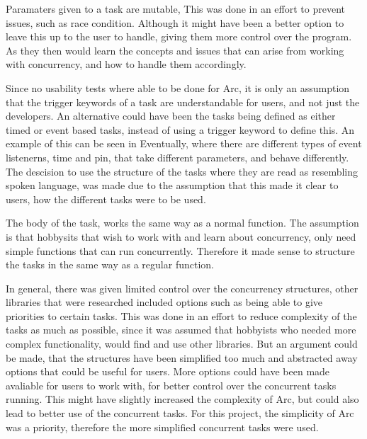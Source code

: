 Paramaters given to a task are mutable, This was done in an effort to prevent issues, such as race condition. Although it might have been a better option to leave this up to the user to handle, giving them more control over the program. As they then would learn the concepts and issues that can arise from working with concurrency, and how to handle them accordingly.

Since no usability tests where able to be done for Arc, it is only an assumption that the trigger keywords of a task are understandable for users, and not just the developers. An alternative could have been the tasks being defined as either timed or event based tasks, instead of using a trigger keyword to define this. An example of this can be seen in Eventually, where there are different types of event listenerns, time and pin, that take different parameters, and behave differently. The descision to use the structure of the tasks where they are read as resembling spoken language, was made due to the assumption that this made it clear to users, how the different tasks were to be used.





The body of the task, works the same way as a normal function. The assumption is that hobbysits that wish to work with and learn about concurrency, only need simple functions that can run concurrently. Therefore it made sense to structure the tasks in the same way as a regular function.

In general, there was given limited control over the concurrency structures, other libraries that were researched included options such as being able to give priorities to certain tasks. This was done in an effort to reduce complexity of the tasks as much as possible, since it was assumed that hobbyists who needed more complex functionality, would find and use other libraries. But an argument could be made, that the structures have been simplified too much and abstracted away options that could be useful for users. More options could have been made avaliable for users to work with, for better control over the concurrent tasks running. This might have slightly increased the complexity of Arc, but could also lead to better use of the concurrent tasks. For this project, the simplicity of Arc was a priority, therefore the more simplified concurrent tasks were used.


